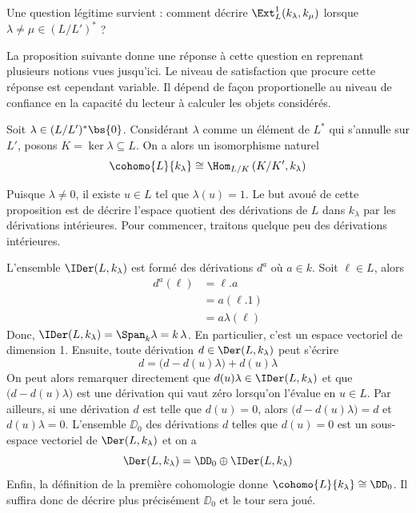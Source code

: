 Une question légitime survient : comment décrire $\Ext_L^1(k_\lambda,k_\mu)$ lorsque $\lambda \neq \mu \in (L/L')^*$ ? 

La proposition suivante donne une réponse à cette question en reprenant plusieurs notions vues jusqu'ici. Le niveau de satisfaction que procure cette réponse est cependant variable. Il dépend de façon proportionelle au niveau de confiance en la capacité du lecteur à calculer les objets considérés.

\begin{Prop} Soit $\lambda \in (L/L')^* \bs \{0\}$. Considérant $\lambda$ comme un élément de $L^*$ qui s'annulle sur $L'$, posons $K = \ker \lambda \subseteq L$. On a alors un isomorphisme naturel
\begin{equation*}
\cohomo{L}{k_\lambda} \cong \Hom_{L/K}\left(K/K',k_\lambda\right)
\end{equation*}
\begin{pre} Puisque $\lambda \neq 0$, il existe $u \in L$ tel que $\lambda(u) = 1$. Le but avoué de cette proposition est de décrire l'espace quotient des dérivations de $L$ dans $k_\lambda$ par les dérivations intérieures. Pour commencer, traitons quelque peu des dérivations intérieures.

L'ensemble $\IDer(L,k_\lambda)$ est formé des dérivations $d^a$ où $a \in k$. Soit $\ell \in L$, alors
\begin{align*}
d^a(\ell) &= \ell.a\\
&= a(\ell.1)\\
&= a\lambda(\ell)
\end{align*}
Donc, $\IDer(L,k_\lambda) = \Span_k \lambda = k \, \lambda$. En particulier, c'est un espace vectoriel de dimension 1. Ensuite, toute dérivation $d \in \Der(L,k_\lambda)$ peut s'écrire
$$ d = \big(d - d(u)\lambda\big) + d(u)\lambda $$
On peut alors remarquer directement que $d(u) \lambda \in \IDer(L,k_\lambda)$ et que $\big(d - d(u)\lambda\big)$ est une dérivation qui vaut zéro lorsqu'on l'évalue en $u \in L$. Par ailleurs, si une dérivation $d$ est telle que $d(u) = 0$, alors $\big(d - d(u)\lambda\big) = d$ et $d(u)\lambda = 0$. L'ensemble $\DD_0$ des dérivations $d$ telles que $d(u) = 0$ est un sous-espace vectoriel de $\Der(L,k_\lambda)$ et on a 
$$ \Der(L,k_\lambda) = \DD_0 \oplus \IDer(L,k_\lambda) $$
Enfin, la définition de la première cohomologie donne $\cohomo{L}{k_\lambda} \cong \DD_0$. Il suffira donc de décrire plus précisément $\DD_0$ et le tour sera joué.


\end{pre}
\end{Prop}
